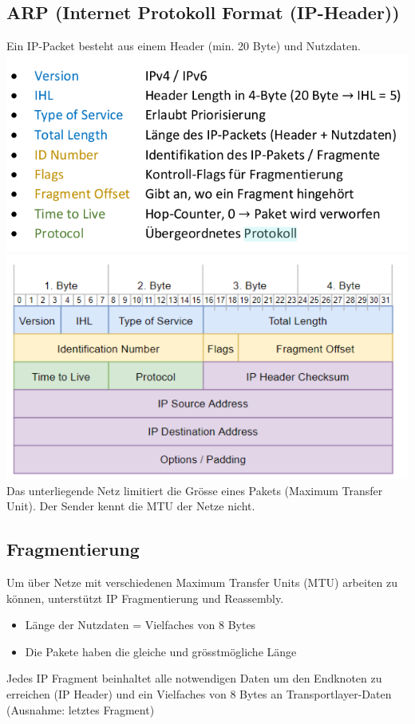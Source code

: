 \subsection{ARP (Internet Protokoll Format (IP-Header))}
{Ein IP-Packet besteht aus einem Header (min. 20 Byte) und Nutzdaten.}
\includegraphics[scale=0.375]{img/ip-header-1.png}
\includegraphics[scale=0.4125]{img/ip-header-2.png.png}
{Das unterliegende Netz limitiert die Grösse eines Pakets (Maximum Transfer Unit). Der Sender kennt die MTU der Netze nicht.}

\subsection{Fragmentierung}{
    Um über Netze mit verschiedenen Maximum Transfer Units (MTU) arbeiten zu können, unterstützt IP
    Fragmentierung und Reassembly.
    \begin{itemize}[noitemsep]
        \item Länge der Nutzdaten = Vielfaches von 8 Bytes
        \item Die Pakete haben die gleiche und grösstmögliche Länge
    \end{itemize}

    Jedes IP Fragment beinhaltet alle notwendigen Daten um den Endknoten zu erreichen (IP Header) und ein
    Vielfaches von 8 Bytes an Transportlayer-Daten (Ausnahme: letztes Fragment)
}

